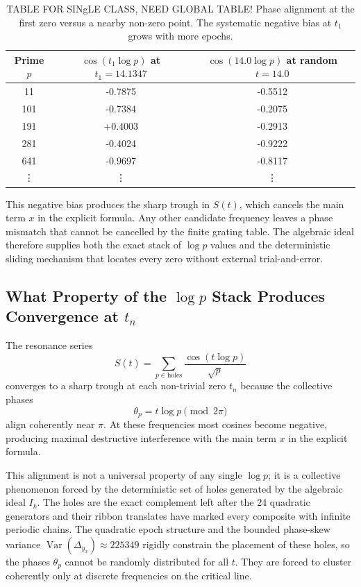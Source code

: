 \documentclass[11pt,a4paper]{article}
\begin{document}
\begin{table}[htbp]
\centering
\begin{tabular}{c|c|c}
Prime \(p\) & \(\cos(t_1 \log p)\) at \(t_1=14.1347\) & \(\cos(14.0 \log p)\) at random \(t=14.0\) \\
\hline
11  & -0.7875 & -0.5512 \\
101 & -0.7384 & -0.2075 \\
191 & +0.4003 & -0.2913 \\
281 & -0.4024 & -0.9222 \\
641 & -0.9697 & -0.8117 \\
\vdots & \vdots & \vdots
\end{tabular}
\caption{TABLE FOR SINgLE CLASS, NEED GLOBAL TABLE! Phase alignment at the first zero versus a nearby non-zero point. The systematic negative bias at \(t_1\) grows with more epochs.}
\label{tab:phase-alignment}
\end{table}

This negative bias produces the sharp trough in \(S(t)\), which cancels the main term \(x\) in the explicit formula. Any other candidate frequency leaves a phase mismatch that cannot be cancelled by the finite grating table. The algebraic ideal therefore supplies both the exact stack of \(\log p\) values and the deterministic sliding mechanism that locates every zero without external trial-and-error.

\subsection{What Property of the \(\log p\) Stack Produces Convergence at \(t_n\)}

The resonance series
\[
S(t)=\sum_{p\in\text{holes}}\frac{\cos(t\log p)}{\sqrt{p}}
\]
converges to a sharp trough at each non-trivial zero \(t_n\) because the collective phases
\[
\theta_p = t \log p \pmod{2\pi}
\]
align coherently near \(\pi\). At these frequencies most cosines become negative, producing maximal destructive interference with the main term \(x\) in the explicit formula.

This alignment is not a universal property of any single \(\log p\); it is a collective phenomenon forced by the deterministic set of holes generated by the algebraic ideal \(I_k\). The holes are the exact complement left after the 24 quadratic generators and their ribbon translates have marked every composite with infinite periodic chains. The quadratic epoch structure and the bounded phase-skew variance \(\operatorname{Var}(\Delta_{y_x})\approx225349\) rigidly constrain the placement of these holes, so the phases \(\theta_p\) cannot be randomly distributed for all \(t\). They are forced to cluster coherently only at discrete frequencies on the critical line.
\end{document}
